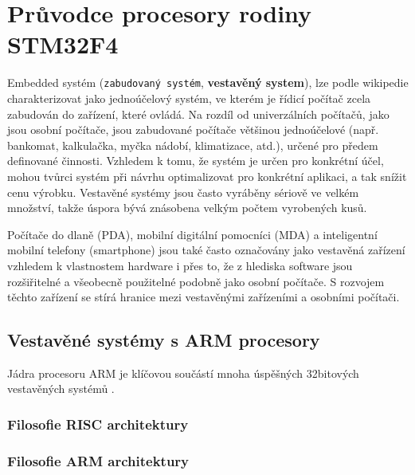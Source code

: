 \chapter{Průvodce procesory rodiny STM32F4}
\minitoc
Embedded systém (\texttt{zabudovaný systém}, \textbf{vestavěný system}), lze podle wikipedie 
charakterizovat jako jednoúčelový systém, ve kterém je řídicí počítač zcela zabudován do zařízení, 
které ovládá. Na rozdíl od univerzálních počítačů, jako jsou osobní počítače, jsou zabudované 
počítače většinou jednoúčelové (např. bankomat, kalkulačka, myčka nádobí, klimatizace, atd.), 
určené pro předem definované činnosti. Vzhledem k tomu, že systém je určen pro konkrétní účel, 
mohou tvůrci systém při návrhu optimalizovat pro konkrétní aplikaci, a tak snížit cenu výrobku. 
Vestavěné systémy jsou často vyráběny sériově ve velkém množství, takže úspora bývá znásobena 
velkým počtem vyrobených kusů.

Počítače do dlaně (PDA), mobilní digitální pomocníci (MDA) a inteligentní mobilní telefony 
(smartphone) jsou také často označovány jako vestavěná zařízení vzhledem k vlastnostem hardware i 
přes to, že z hlediska software jsou rozšiřitelné a všeobecně použitelné podobně jako osobní 
počítače. S rozvojem těchto zařízení se stírá hranice mezi vestavěnými zařízeními a osobními 
počítači.

\section{Vestavěné systémy s ARM procesory}
  Jádra procesoru ARM je klíčovou součástí mnoha úspěšných 32bitových vestavěných systémů 
  \cite[s.~3]{sloss2004arm}.
  
  \subsection{Filosofie RISC architektury}
  
  \subsection{Filosofie ARM architektury}

